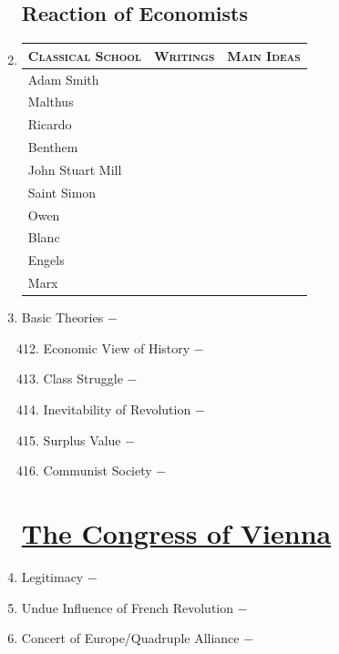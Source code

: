 \documentclass[12pt]{article}
\begin{document}
\begin{enumerate}
\subsection{Reaction of Economists}

\item \begin{tabular}{l c c}
\textsc{Classical School} & \textsc{Writings} & \textsc{Main Ideas} \\
\hline
Adam Smith & & \\
\hline
Malthus & & \\
\hline 
Ricardo & & \\
\hline
Benthem & & \\
\hline
John Stuart Mill & & \\
\hline
Saint Simon & & \\
\hline
Owen & & \\
\hline
Blanc & & \\
\hline
Engels & & \\
\hline
Marx & & \\
\end{tabular}

\item Basic Theories $-$

\begin{enumerate}[label=\arabic{*}.]
\setcounter{enumii}{411}

\item Economic View of History $-$

\item Class Struggle $-$

\item Inevitability of Revolution $-$ 

\item Surplus Value $-$

\item Communist Society $-$ 

\end{enumerate}
\setcounter{enumi}{416}

\section{\underline{The Congress of Vienna}}

\item Legitimacy $-$ 

\item Undue Influence of French Revolution $-$ 

\item Concert of Europe/Quadruple Alliance $-$


\end{enumerate}
\end{document}

